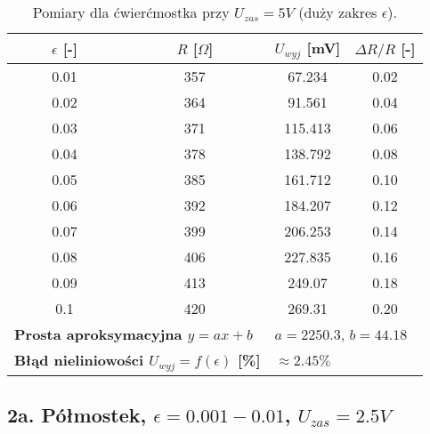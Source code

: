 \documentclass[12pt, a4paper]{article}
\begin{document}
	\begin{table}[H]
		\centering
		\caption{Pomiary dla ćwierćmostka przy $U_{zas} = 5 V$ (duży zakres $\epsilon$).}
		\begin{tabular}{cccc}
			\toprule
			$\epsilon$ [-] & $R$ [$\Omega$] & $U_{wyj}$ [mV] & $\Delta R/R$ [-] \\
			\midrule
			0.01 & 357 & 67.234 & 0.02 \\
			0.02 & 364 & 91.561 & 0.04 \\
			0.03 & 371 & 115.413 & 0.06 \\
			0.04 & 378 & 138.792 & 0.08 \\
			0.05 & 385 & 161.712 & 0.10 \\
			0.06 & 392 & 184.207 & 0.12 \\
			0.07 & 399 & 206.253 & 0.14 \\
			0.08 & 406 & 227.835 & 0.16 \\
			0.09 & 413 & 249.07 & 0.18 \\
			0.1 & 420 & 269.31 & 0.20 \\
			\midrule
			\multicolumn{2}{l}{\textbf{Prosta aproksymacyjna $y = ax + b$}} & \multicolumn{2}{l}{$a = 2250.3$, $b = 44.18$} \\
			\multicolumn{2}{l}{\textbf{Błąd nieliniowości $U_{wyj} = f(\epsilon)$ [\%]}} & \multicolumn{2}{l}{$\approx 2.45 \%$} \\
			\bottomrule
		\end{tabular}
	\end{table}
	
	\newpage
	\subsection{2a. Półmostek, $\epsilon = 0.001-0.01$, $U_{zas} = 2.5 V$}
	
\end{document}

